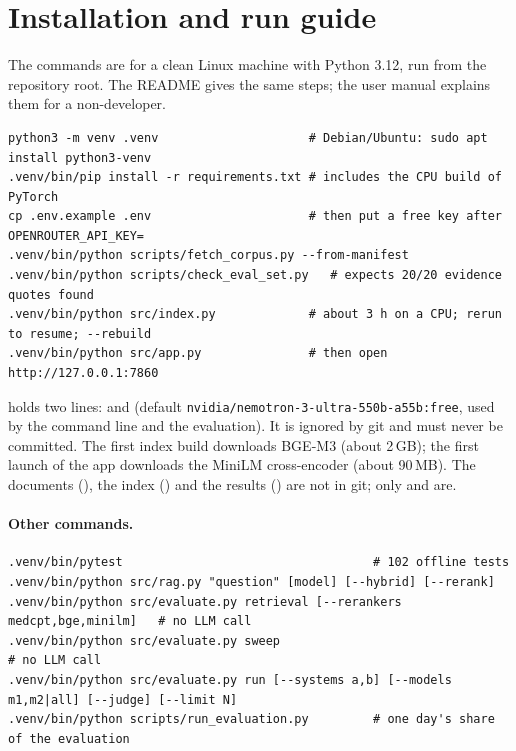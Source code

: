 \section{Installation and run guide}
\label{sec:install}

The commands are for a clean Linux machine with Python 3.12, run from the repository root. The
README gives the same steps; the user manual explains them for a non-developer.

\begin{lstlisting}
python3 -m venv .venv                     # Debian/Ubuntu: sudo apt install python3-venv
.venv/bin/pip install -r requirements.txt # includes the CPU build of PyTorch
cp .env.example .env                      # then put a free key after OPENROUTER_API_KEY=
.venv/bin/python scripts/fetch_corpus.py --from-manifest
.venv/bin/python scripts/check_eval_set.py   # expects 20/20 evidence quotes found
.venv/bin/python src/index.py             # about 3 h on a CPU; rerun to resume; --rebuild
.venv/bin/python src/app.py               # then open http://127.0.0.1:7860
\end{lstlisting}

 holds two lines:  and  (default
\nolinkurl{nvidia/nemotron-3-ultra-550b-a55b:free}, used by the command line and the evaluation). It is
ignored by git and must never be committed. The first index build downloads BGE-M3 (about 2\,GB); the
first launch of the app downloads the MiniLM cross-encoder (about 90\,MB). The documents
(), the index () and the results () are not in git;
only  and  are.

\paragraph{Other commands.}
\begin{lstlisting}
.venv/bin/pytest                                   # 102 offline tests
.venv/bin/python src/rag.py "question" [model] [--hybrid] [--rerank]
.venv/bin/python src/evaluate.py retrieval [--rerankers medcpt,bge,minilm]   # no LLM call
.venv/bin/python src/evaluate.py sweep                                       # no LLM call
.venv/bin/python src/evaluate.py run [--systems a,b] [--models m1,m2|all] [--judge] [--limit N]
.venv/bin/python scripts/run_evaluation.py         # one day's share of the evaluation
\end{lstlisting}


